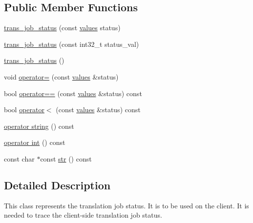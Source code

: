 \subsection*{Public Member Functions}
\begin{DoxyCompactItemize}
\item 
\hyperlink{classuva_1_1smt_1_1bpbd_1_1client_1_1trans__job__status_af9a56ef51172231793447855d3b034b8}{trans\+\_\+job\+\_\+status} (const \hyperlink{classuva_1_1smt_1_1bpbd_1_1client_1_1trans__job__status_a80cd5ec4a7e4de9541f48e6b5ccb866d}{values} status)
\item 
\hyperlink{classuva_1_1smt_1_1bpbd_1_1client_1_1trans__job__status_aba62ac2555e1061ff10fdb95eeec4504}{trans\+\_\+job\+\_\+status} (const int32\+\_\+t status\+\_\+val)
\item 
\hyperlink{classuva_1_1smt_1_1bpbd_1_1client_1_1trans__job__status_aab2be3621dba4c96198c91c0f9a2592f}{trans\+\_\+job\+\_\+status} ()
\item 
void \hyperlink{classuva_1_1smt_1_1bpbd_1_1client_1_1trans__job__status_a421e243d3b4b614d90589279d3b4fdc6}{operator=} (const \hyperlink{classuva_1_1smt_1_1bpbd_1_1client_1_1trans__job__status_a80cd5ec4a7e4de9541f48e6b5ccb866d}{values} \&status)
\item 
bool \hyperlink{classuva_1_1smt_1_1bpbd_1_1client_1_1trans__job__status_a9cc419b2b5958ad4468e1483a3bd93a6}{operator==} (const \hyperlink{classuva_1_1smt_1_1bpbd_1_1client_1_1trans__job__status_a80cd5ec4a7e4de9541f48e6b5ccb866d}{values} \&status) const 
\item 
bool \hyperlink{classuva_1_1smt_1_1bpbd_1_1client_1_1trans__job__status_a15b8f505c231bc81cc94b6598a12a87b}{operator$<$} (const \hyperlink{classuva_1_1smt_1_1bpbd_1_1client_1_1trans__job__status_a80cd5ec4a7e4de9541f48e6b5ccb866d}{values} \&status) const 
\item 
\hyperlink{classuva_1_1smt_1_1bpbd_1_1client_1_1trans__job__status_a684cd9cc3e3bca400c1842afb59b433d}{operator string} () const 
\item 
\hyperlink{classuva_1_1smt_1_1bpbd_1_1client_1_1trans__job__status_afad7ef7d08fc24afa7e89f577132aa6c}{operator int} () const 
\item 
const char $\ast$const \hyperlink{classuva_1_1smt_1_1bpbd_1_1client_1_1trans__job__status_ad55dd5249213e5f7968dbc10cfb9fdff}{str} () const 
\end{DoxyCompactItemize}


\subsection{Detailed Description}
This class represents the translation job status. It is to be used on the client. It is needed to trace the client-\/side translation job status. 

